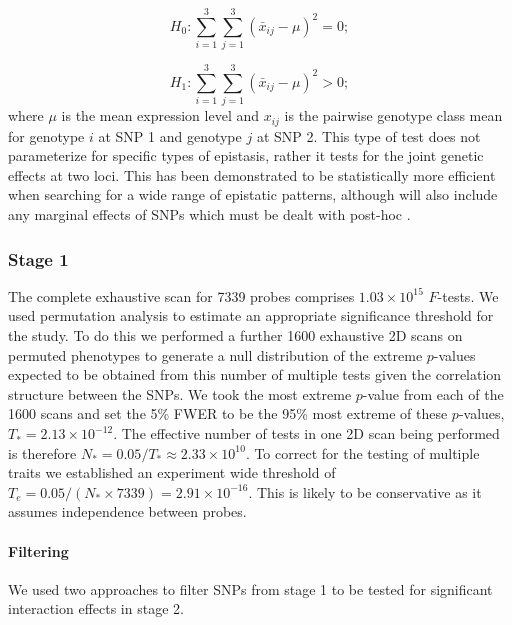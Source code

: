 \documentclass{article}
\begin{document}
\begin{equation}
H _0 : \sum _{i=1} ^3 \sum _{j=1} ^3 (\bar x _{ij} - \mu) ^2 = 0; 
\end{equation}

\begin{equation}
H _1 : \sum _{i=1} ^3 \sum _{j=1} ^3 (\bar x _{ij} - \mu) ^2 > 0; 
\label{eq:8df}
\end{equation}
where $\mu$ is the mean expression level and $x _{ij}$ is the pairwise genotype class mean for genotype $i$ at SNP 1 and genotype $j$ at SNP 2. This type of test does not parameterize for specific types of epistasis, rather it tests for the joint genetic effects at two loci. This has been demonstrated to be statistically more efficient when searching for a wide range of epistatic patterns, although will also include any marginal effects of SNPs which must be dealt with post-hoc \cite{Hemani2013}.

\subsubsection{Stage 1}
 
The complete exhaustive scan for 7339 probes comprises $1.03 \times 10^{15}$ $F$-tests. We used permutation analysis to estimate an appropriate significance threshold for the study. To do this we performed a further 1600 exhaustive 2D scans on permuted phenotypes to generate a null distribution of the extreme $p$-values expected to be obtained from this number of multiple tests given the correlation structure between the SNPs. We took the most extreme $p$-value from each of the 1600 scans and set the 5\% FWER to be the 95\% most extreme of these $p$-values, $T_{*} = 2.13 \times 10^{-12}$. The effective number of tests in one 2D scan being performed is therefore $N_{*} = 0.05 / T_{*} \approx 2.33 \times 10^{10}$. To correct for the testing of multiple traits we established an experiment wide threshold of $T_{e} = 0.05 / (N_{*} \times 7339) = 2.91 \times 10^{-16}$. This is likely to be conservative as it assumes independence between probes.

\paragraph{Filtering} We used two approaches to filter SNPs from stage 1 to be tested for significant interaction effects in stage 2.
\end{document}
